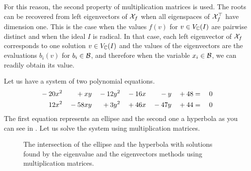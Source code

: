 For this reason, the second property of multiplication matrices is used.
The roots can be recovered from left eigenvectors of $\mathcal{X}_f$ when all eigenspaces of $\mathcal{X}_f^\top$ have dimension one.
This is the case when the values $f(v)$ for $v\in V_{\mathbb{C}}(I)$ are pairwise distinct and when the ideal $I$ is radical.
In that case, each left eigenvector of $\mathcal{X}_f$ corresponds to one solution $v\in V_{\mathbb{C}}(I)$ and the values of the eigenvectors are the evaluations $b_i(v)$ for $b_i\in\mathcal{B}$, and therefore when the variable $x_i\in\mathcal{B}$, we can readily obtain its value.

\begin{example}
  Let us have a system of two polynomial equations.
  \begin{alignat}{13}
    {}-{}20 & x^2 & {}+{}   & xy & {}-{}12 & y^2 & {}-{}16 & x & {}-{}   & y & {}+{}48 & {}={} & 0 \labeleq{POP:mm:example1}\\
    12      & x^2 & {}-{}58 & xy & {}+{}3  & y^2 & {}+{}46 & x & {}-{}47 & y & {}+{}44 & {}={} & 0 \labeleq{POP:mm:example2}
  \end{alignat}
  The first equation represents an ellipse and the second one a hyperbola as you can see in .
  Let us solve the system using multiplication matrices.

  \begin{figure}[ht]
    \centering
    \resizebox{0.95\textwidth}{!}{}
    \caption{The intersection of the ellipse  and the hyperbola  with solutions found by the eigenvalue and the eigenvectors methods using multiplication matrices.}
  \end{figure}


\end{example}
